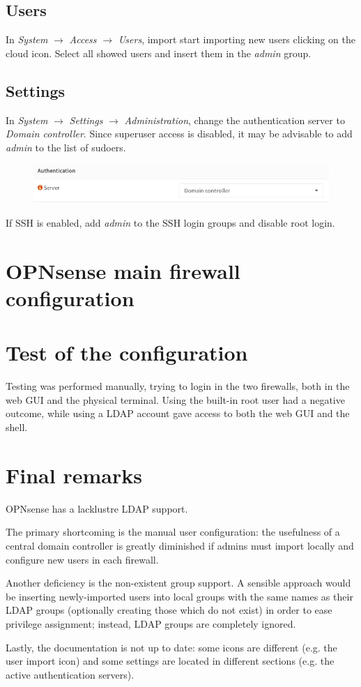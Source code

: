 \documentclass[draft]{homework}
\newcommand{\opn}{OPNsense\xspace}
\begin{document}
    \subsection{Users}
    In \textit{System} $\rightarrow$ \textit{Access} $\rightarrow$ \textit{Users}, import start importing new users clicking on the cloud icon.
    Select all showed users and insert them in the \textit{admin} group.
    
    \subsection{Settings}
    In \textit{System} $\rightarrow$ \textit{Settings} $\rightarrow$ \textit{Administration}, change the authentication server to \textit{Domain controller}.
    Since superuser access is disabled, it may be advisable to add \textit{admin} to the list of sudoers.
    \begin{figure}[H]
        \centering
        \includegraphics[width=\linewidth]{images/settings}
        \label{fig:settings}
    \end{figure}
    
    If SSH is enabled, add \textit{admin} to the SSH login groups and disable root login.
    
    
    \section{\opn main firewall configuration}
    
    
    \section{Test of the configuration}
    Testing was performed manually, trying to login in the two firewalls, both in the web GUI and the physical terminal.
    Using the built-in root user had a negative outcome, while using a LDAP account gave access to both the web GUI and the shell.
    
    
    \section{Final remarks}
    \opn has a lacklustre LDAP support.
    
    The primary shortcoming is the manual user configuration: the usefulness of a central domain controller is greatly diminished if admins must import locally and configure new users in each firewall.
    
    Another deficiency is the non-existent group support.
    A sensible approach would be inserting newly-imported users into local groups with the same names as their LDAP groups (optionally creating those which do not exist) in order to ease privilege assignment; instead, LDAP groups are completely ignored.
    
    Lastly, the documentation is not up to date: some icons are different (e.g. the user import icon) and some settings are located in different sections (e.g. the active authentication servers).
\end{document}

